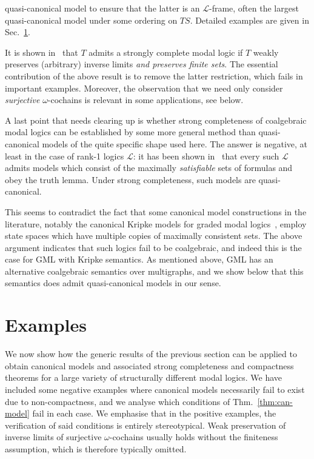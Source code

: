 \documentclass[proceedings]{stacs}
\theoremstyle{definition}
\theoremstyle{plain}
\newcommand{\Lang}{\mathcal{L}}
\begin{document}
quasi-canonical model to ensure that the latter is an $\Lang$-frame,
often the largest quasi-canonical model under some ordering on
$TS$. Detailed examples are given in Sec.~\ref{sec:examples}.
\begin{rem}
  It is shown in~\cite{KurzRosicky} that $T$ admits a strongly
  complete modal logic if $T$ weakly preserves (arbitrary) inverse
  limits \emph{and preserves finite sets}. The essential contribution
  of the above result is to remove the latter restriction, which fails
  in important examples. Moreover, the observation that we need only
  consider \emph{surjective} $\omega$-cochains is relevant in some
  applications, see below.
\end{rem}

\begin{rem}
  A last point that needs clearing up is whether strong completeness
  of coalgebraic modal logics can be established by some more general
  method than quasi-canonical models of the quite specific shape used
  here. The answer is negative, at least in the case of rank-1 logics
  $\Lang$: it has been shown in~\cite{KurzPattinson05} that every such
  $\Lang$ admits models which consist of the maximally
  \emph{satisfiable} sets of formulas and obey the truth lemma. Under
  strong completeness, such models are quasi-canonical.

  This seems to contradict the fact that some canonical model
  constructions in the literature, notably the canonical Kripke models
  for graded modal logics~\cite{Fine72,DeCaro88}, employ state spaces
  which have multiple copies of maximally consistent sets.  The above
  argument indicates that such logics fail to be coalgebraic, and
  indeed this is the case for GML with Kripke
  semantics. As mentioned above, GML has an alternative
  coalgebraic semantics over multigraphs, and we show below that this
  semantics does admit quasi-canonical models in our sense.
\end{rem}

\section{Examples}\label{sec:examples}

\noindent We now show how the generic results of the previous section
can be applied to obtain canonical models and associated strong
completeness and compactness theorems for a large variety of
structurally different modal logics. We have included some negative
examples where canonical models necessarily fail to exist due to
non-compactness, and we analyse which conditions of
Thm.~\ref{thm:can-model} fail in each case. We emphasise that in
the positive examples, the verification of said conditions is entirely
stereotypical. Weak preservation of inverse limits of surjective
$\omega$-cochains usually holds without the finiteness assumption,
which is therefore typically omitted.
\end{document}
